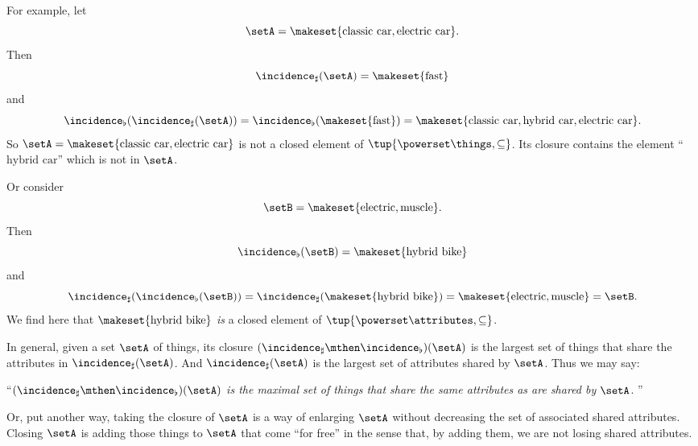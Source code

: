 For example, let
\begin{equation}\label{eq:cfa-closure-example-1}
    \setA = \makeset{\text{classic car}, \text{electric car}}.
\end{equation}
Then
\begin{equation}\label{eq:cfa-closure-example-2}
    \incidence_\sharp(\setA) = \makeset{\text{fast}}
\end{equation}
and
\begin{equation}\label{eq:cfa-closure-example-3}
    \incidence_\flat(\incidence_\sharp(\setA)) = \incidence_\flat(\makeset{\text{fast}}) = \makeset{\text{classic car}, \text{hybrid car}, \text{electric car}}.
\end{equation}
So $\setA = \makeset{\text{classic car}, \text{electric car}}$ is not a closed element of $\tup{\powerset \things, \subseteq}$.
Its closure contains the element ``$\text{hybrid car}$'' which is not in $\setA$.

Or consider
\begin{equation}\label{eq:cfa-closure-example-4}
    \setB = \makeset{\text{electric}, \text{muscle}}.
\end{equation}
Then
\begin{equation}\label{eq:cfa-closure-example-5}
    \incidence_\flat(\setB) = \makeset{\text{hybrid bike}}
\end{equation}
and
\begin{equation}\label{eq:cfa-closure-example-6}
    \incidence_\sharp(\incidence_\flat(\setB)) = \incidence_\sharp(\makeset{\text{hybrid bike}}) = \makeset{\text{electric}, \text{muscle}} = \setB.
\end{equation}
We find here that $\makeset{\text{hybrid bike}}$ \emph{is} a closed element of $\tup{\powerset \attributes, \subseteq}$.

In general, given a set $\setA$ of things, its closure $(\incidence_\sharp \mthen \incidence_\flat)(\setA)$ is the largest set of things that share the attributes in $\incidence_\sharp(\setA)$.
And $\incidence_\sharp(\setA)$ is the largest set of attributes shared by $\setA$.
Thus we may say:

``\emph{$(\incidence_\sharp \mthen \incidence_\flat)(\setA)$ is the maximal set of things that share the same attributes as are shared by $\setA$}.
''

Or, put another way, taking the closure of $\setA$ is a way of enlarging $\setA$ without decreasing the set of associated shared attributes.
Closing $\setA$ is adding those things to $\setA$ that come ``for free'' in the sense that, by adding them, we are not losing shared attributes.

